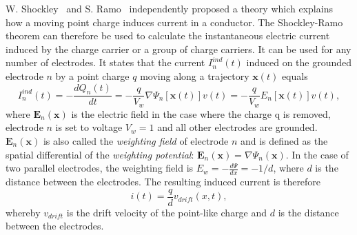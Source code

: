 \documentclass[twoside,12pt]{packages/mytustyle}  %
\begin{document}
W. Shockley~\cite{SHOCKLEY:00000} and S. Ramo~\cite{RAMO:00000} independently proposed a theory which explains how a moving point charge induces current in a conductor. The Shockley-Ramo theorem can therefore be used to calculate the instantaneous electric current induced by the charge carrier or a group of charge carriers. It can be used for any number of electrodes. It states that the current $I_n^{ind}(t)$ induced on the grounded electrode $n$ by a point charge $q$ moving along a trajectory $\textbf{x}(t)$ equals
\begin{equation}
\label{eq:ramo}
I_n^{ind}(t) = -\frac{dQ_n(t)}{dt} =  -\frac{q}{V_w}\nabla\Psi_n[\textbf{x}(t)]v(t)  =  -\frac{q}{V_w}E_n[\textbf{x}(t)]v(t),
\end{equation}
where $\textbf{E}_n(\textbf{x})$ is the electric field in the case where the charge q is removed, electrode $n$ is  set to voltage $V_w=1$ and all other electrodes are grounded. $\textbf{E}_n(\textbf{x})$ is also called the \emph{weighting field} of electrode $n$ and is defined as the spatial differential of the \emph{weighting potential}: $\textbf{E}_n(\textbf{x})=\nabla \Psi_n(\textbf{x})$. In the case of two parallel electrodes, the weighting field is $E_w = -\frac{d\Psi}{dx} = -1/d$, where $d$ is the distance between the electrodes. The resulting induced current is therefore
\begin{equation}
\label{eq:ramoparallel}
i(t) = \frac{q}{d}v_{drift}(x,t),
\end{equation} 
whereby $v_{drift}$ is the drift velocity of the point-like charge and $d$ is the distance between the electrodes.






\end{document}
